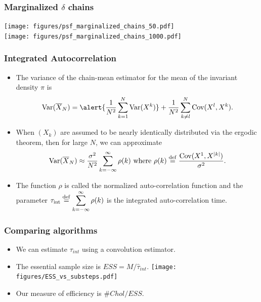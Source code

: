\documentclass[]{beamer}
\renewcommand{\bar}{\overline}
\renewcommand{\hat}{\widehat}
\newcommand{\eqdef}{\stackrel{\rm def}{=}}
\begin{document}
\begin{frame}[t]
  \frametitle{Marginalized $\delta$ chains}
  \vspace{-1.2em}
  \begin{center}
    \texttt{[image: figures/psf\_marginalized\_chains\_50.pdf]}\\
    \texttt{[image: figures/psf\_marginalized\_chains\_1000.pdf]}\\ 
  \end{center}
\end{frame}

\begin{frame}[t]
  \frametitle{Integrated Autocorrelation}
  \begin{itemize}
  \itemsep 1.2em
  \item The variance of the chain-mean estimator for the mean of the invariant density $\pi$ is
  $$
    {\rm Var}(\bar X_N) = \alert{\frac{1}{N^2}\sum_{k=1}^N{\rm Var}(X^k)}+\frac{1}{N^2}\sum_{k\neq l}^N {\rm Cov}(X^l,X^k).
  $$
  \item When $(X_k)$ are assumed to be nearly \alert{identically distributed} via the ergodic theorem, then for large $N$, we can approximate
  $$
    {\rm Var}(\bar X_N) \approx \frac{\sigma^2}{N^2}\sum_{k=-\infty}^\infty \rho(k) \text{ where }  \rho(k) \eqdef \frac{\mathrm{Cov}(X^1, X^{|k|})}{\sigma^2}.
  $$
  \item The function $\rho$ is called the \alert{normalized auto-correlation function} and the parameter $\displaystyle{\tau_{\rm int}\eqdef \sum_{k=-\infty}^\infty \rho(k)}$ is the \alert{integrated auto-correlation time}.
  \end{itemize}
  
\end{frame}
\begin{frame}[t]
  \frametitle{Comparing algorithms}
  \begin{itemize}
    \item We can estimate $\tau_{int}$ using a convolution estimator.
    \item The essential sample size is \alert{$ESS = M / \hat{\tau}_{int}$}.
    \texttt{[image: figures/ESS\_vs\_substeps.pdf]}
    \item Our measure of efficiency is \alert{$\#Chol/ESS$}.
  \end{itemize}
  
\end{frame}
\end{document}
